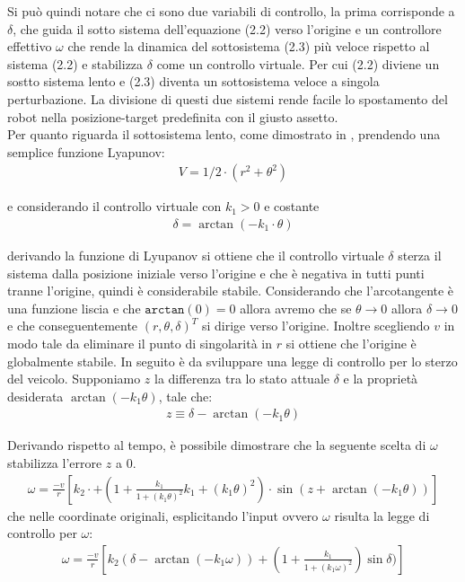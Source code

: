 \documentclass[a4paper,11 pt,oneside]{book}
\theoremstyle{definition}
\begin{document}
Si può quindi notare che ci sono due variabili di controllo, la prima corrisponde a $\delta$, che guida il sotto sistema dell'equazione (2.2) verso l'origine e un controllore effettivo $\omega$ che rende la dinamica del sottosistema (2.3) più veloce rispetto al sistema (2.2) e stabilizza $\delta$ come un controllo virtuale. Per cui (2.2) diviene un sostto sistema lento e (2.3) diventa un sottosistema veloce a singola perturbazione. La divisione di questi due sistemi rende facile lo spostamento del robot nella posizione-target predefinita con il giusto assetto.
\\
Per quanto riguarda il sottosistema lento, come dimostrato in \cite{CONTROLLO:1}, prendendo una semplice funzione Lyapunov:
\begin{align}
 V = 1/2\cdot(r^2 + \theta^2)
\end{align}

e considerando il controllo virtuale con $k_1 > 0$ e costante
\begin{align}
 \delta = \arctan(-k_1\cdot\theta)
\end{align}

derivando la funzione di Lyupanov si ottiene che il controllo virtuale $\delta$ sterza il sistema dalla posizione iniziale verso l'origine e che è negativa in tutti punti tranne l'origine, quindi è considerabile stabile.
Considerando che l'arcotangente è una funzione liscia e che  $\texttt{arctan}(0)=0$ allora avremo che se $\theta\to 0$ allora $\delta \to 0$ e che conseguentemente $(r,\theta,\delta)^{T}$ si dirige verso l'origine. Inoltre scegliendo $v$ in modo tale da eliminare il punto di singolarità in $r$ si ottiene che l'origine è globalmente stabile.
In seguito è da sviluppare una legge di controllo per lo sterzo del veicolo.
Supponiamo $z$ la differenza tra lo stato attuale $\delta$ e la proprietà desiderata $\arctan(-k_1\theta)$, tale che:
\begin{align}
z\equiv\delta - \arctan(-k_1\theta)
\end{align}

Derivando rispetto al tempo, è possibile dimostrare che la seguente scelta di $\omega$ stabilizza l'errore $z$ a $0$.
\begin{align}
\omega = \frac{-v}{r} \left[ k_2\cdot + (1 + \frac{k_1}{1+ (k_1\theta)^2}k_1+(k_1\theta)^2)\cdot\sin(z + \arctan(-k_1\theta)) \right] 
\end{align}
che nelle coordinate originali, esplicitando l'input ovvero $\omega$ risulta la legge di controllo per $\omega$:
\begin{align}
\label{cont-law}
\omega = \frac{-v}{r} \left[ k_2(\delta - \arctan(-k_1\omega)) + (1 + \frac{k_1}{1 + (k_1\omega)^{2}})\sin\delta) \right]
\end{align}
\end{document}
